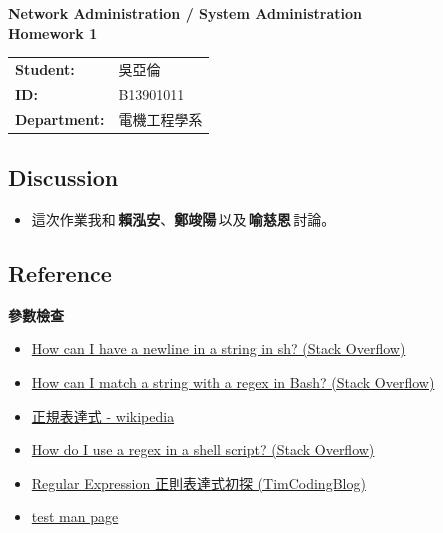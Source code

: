 \documentclass[12pt]{article}
\newenvironment{problem}[2][Problem]{\begin{trivlist}
\item[\hskip \labelsep {\bfseries #1}\hskip \labelsep {\bfseries #2}]}{\end{trivlist}}
\begin{document}
\thispagestyle{fancy}


\begin{center}
  {\large \bfseries Network Administration / System Administration} \\
  \vspace{1em}
  {\Large \bfseries Homework 1} \\
\end{center}

\vspace{2em}

\begin{tabular}{@{}l l}
  \textbf{Student:} & 吳亞倫 \\
  \textbf{ID:} & B13901011  \\
  \textbf{Department:} & 電機工程學系
\end{tabular}
\bigskip

\subsection{Discussion}
\begin{itemize}
  \item 這次作業我和\,\textbf{賴泓安}、\textbf{鄭竣陽}\,以及\,\textbf{喻慈恩}\,討論。
\end{itemize}

\subsection{Reference}

\begin{problem}{1.} \textbf{參數檢查}
  \begin{itemize}
    \item \href{https://stackoverflow.com/questions/3005963/how-can-i-have-a-newline-in-a-string-in-sh}{How can I have a newline in a string in sh? (Stack Overflow)}
    \item \href{https://stackoverflow.com/questions/17420994/how-can-i-match-a-string-with-a-regex-in-bash}{How can I match a string with a regex in Bash? (Stack Overflow)}
    \item \href{https://zh.wikipedia.org/zh-tw/正则表达式}{正規表達式 - wikipedia}
    \item \href{https://stackoverflow.com/questions/35919103/how-do-i-use-a-regex-in-a-shell-script}{How do I use a regex in a shell script? (Stack Overflow)}
    \item \href{https://hsuchihting.github.io/regex/20220731/4121487144/}{Regular Expression 正則表達式初探 (TimCodingBlog)}
    \item \href{https://ss64.com/bash/test.html}{test man page}
  \end{itemize}
\end{problem}
\end{document}
